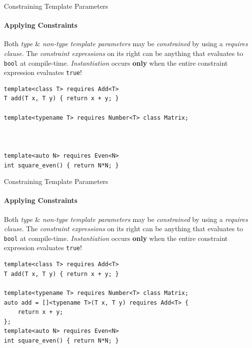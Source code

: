 \documentclass{beamer}
\begin{document}
    \begin{frame}[fragile]{Constraining Template Parameters}
        \framesubtitle{Applying Constraints}
        Both \emph{type} \& \emph{non-type template parameters} may be \emph{constrained} by using a \emph{requires clause}. The \emph{constraint expressions} on its right can be anything that evaluates to \texttt{bool} at compile-time. \emph{Instantiation} occurs \textbf{only} when the entire constraint expression evaluates \texttt{true}!
        \vspace{-1em}
        \begin{center}
        \begin{lstlisting}[caption={constraining types \& values by using the \texttt{requires} clause.}]
template<class T> requires Add<T>
T add(T x, T y) { return x + y; }

template<typename T> requires Number<T> class Matrix;



template<auto N> requires Even<N>
int square_even() { return N*N; } \end{lstlisting}
        \end{center}
    \end{frame}

    \begin{frame}[fragile]{Constraining Template Parameters}
        \framesubtitle{Applying Constraints}
        Both \emph{type} \& \emph{non-type template parameters} may be \emph{constrained} by using a \emph{requires clause}. The \emph{constraint expressions} on its right can be anything that evaluates to \texttt{bool} at compile-time. \emph{Instantiation} occurs \textbf{only} when the entire constraint expression evaluates \texttt{true}!
        \vspace{-1em}
        \begin{center}
        \begin{lstlisting}[caption={which even supports constraining C\texttt{++}20 generic lambdas!?}]
template<class T> requires Add<T>
T add(T x, T y) { return x + y; }

template<typename T> requires Number<T> class Matrix;
auto add = []<typename T>(T x, T y) requires Add<T> {
    return x + y;
};
template<auto N> requires Even<N>
int square_even() { return N*N; } \end{lstlisting}
        \end{center}
    \end{frame}
\end{document}
